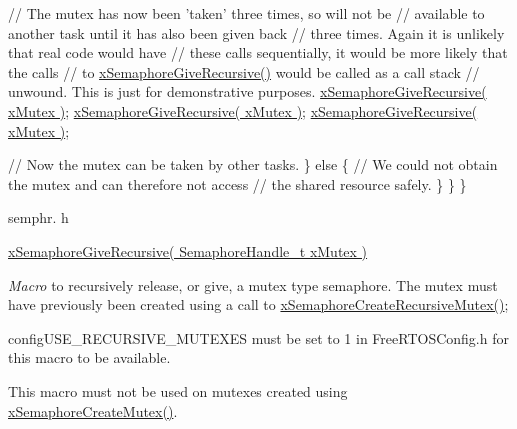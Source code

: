 \begin{DoxyPre}         // The mutex has now been 'taken' three times, so will not be
         // available to another task until it has also been given back
         // three times.  Again it is unlikely that real code would have
         // these calls sequentially, it would be more likely that the calls
         // to \hyperlink{vendor_2ceedling_2plugins_2freertos_2src_2freertos_2include_2semphr_8h_a398d66b17856c22dd49d39aaac42f105}{xSemaphoreGiveRecursive()} would be called as a call stack
         // unwound.  This is just for demonstrative purposes.
         \hyperlink{vendor_2ceedling_2plugins_2freertos_2src_2freertos_2include_2semphr_8h_a398d66b17856c22dd49d39aaac42f105}{xSemaphoreGiveRecursive( xMutex )};
         \hyperlink{vendor_2ceedling_2plugins_2freertos_2src_2freertos_2include_2semphr_8h_a398d66b17856c22dd49d39aaac42f105}{xSemaphoreGiveRecursive( xMutex )};
         \hyperlink{vendor_2ceedling_2plugins_2freertos_2src_2freertos_2include_2semphr_8h_a398d66b17856c22dd49d39aaac42f105}{xSemaphoreGiveRecursive( xMutex )};\end{DoxyPre}



\begin{DoxyPre}         // Now the mutex can be taken by other tasks.
     \}
     else
     \{
         // We could not obtain the mutex and can therefore not access
         // the shared resource safely.
     \}
 \}
\}
\end{DoxyPre}


semphr. h 
\begin{DoxyPre}\hyperlink{vendor_2ceedling_2plugins_2freertos_2src_2freertos_2include_2semphr_8h_a398d66b17856c22dd49d39aaac42f105}{xSemaphoreGiveRecursive( SemaphoreHandle\_t xMutex )}\end{DoxyPre}


{\itshape Macro} to recursively release, or \textquotesingle{}give\textquotesingle{}, a mutex type semaphore. The mutex must have previously been created using a call to \hyperlink{vendor_2ceedling_2plugins_2freertos_2src_2freertos_2include_2semphr_8h_a1bbc843be5a41ea83d2693b2189fc0f8}{x\+Semaphore\+Create\+Recursive\+Mutex()};

config\+U\+S\+E\+\_\+\+R\+E\+C\+U\+R\+S\+I\+V\+E\+\_\+\+M\+U\+T\+E\+X\+ES must be set to 1 in Free\+R\+T\+O\+S\+Config.\+h for this macro to be available.

This macro must not be used on mutexes created using \hyperlink{vendor_2ceedling_2plugins_2freertos_2src_2freertos_2include_2semphr_8h_aa6a00aa9b91a9e5b3ebe4ae1c3f115c6}{x\+Semaphore\+Create\+Mutex()}.

